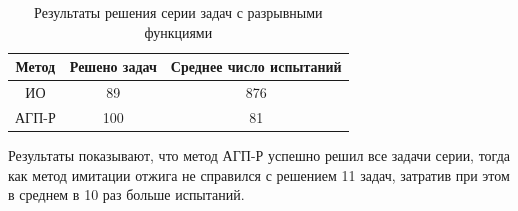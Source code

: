 \documentclass[11pt, oneside, a4paper]{article}
\begin{document}
\begin{table}[h]
	\caption{Результаты решения серии задач с разрывными функциями}
	\begin{center}
		\begin{tabular}{|c|c|c|}
			\hline
			Метод & Решено задач & Среднее число испытаний \\
			\hline
			\hline
			ИО    &  89 &   876  \\
			\hline
			АГП-Р & 100  & 81 \\
			\hline
		\end{tabular}
	\end{center}
\end{table}

Результаты показывают, что метод АГП-Р успешно решил все задачи серии, тогда как метод имитации отжига не справился с решением 11 задач, затратив при этом в среднем в 10 раз больше испытаний.
\end{document}
